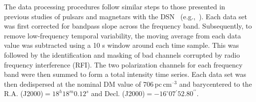 \documentclass[twocolumn]{emulateapj}
\begin{document}


The data processing procedures follow similar steps to those presented in previous studies of pulsars and magnetars with the DSN ~(e.g.,~\citealt{Majid+2017, pearlman2018, pearlman2019b, pearlman2020bright}). Each data set was first corrected for bandpass slope across the frequency band. Subsequently, to remove low-frequency temporal variability, the moving average from each data value was subtracted using a 10 s window around each time sample. This was followed by the identification and masking of bad channels corrupted by radio frequency interference (RFI). The two polarization channels for each frequency band were then summed to form a total intensity time series. Each data set was then dedispersed at the nominal DM value of 706\,pc\,cm$^{\text{--3}}$ \citep{lower2020} and barycentered to the R.A. (J2000)$ =18^{h}18^{m}0.12^{s}$ and Decl. (J2000)$= -16^{\circ} 07{^\prime}52.80^{\prime\prime}$. %
                                                                      
\end{document}
